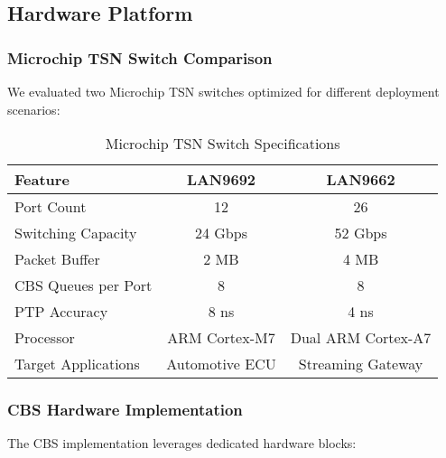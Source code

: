 \documentclass[10pt, journal, compsoc]{IEEEtran}
\begin{document}
\subsection{Hardware Platform}

\subsubsection{Microchip TSN Switch Comparison}

We evaluated two Microchip TSN switches optimized for different deployment scenarios:

\begin{table}[h]
\centering
\caption{Microchip TSN Switch Specifications}
\label{tab:microchip_specs}
\begin{tabular}{lcc}
\toprule
\textbf{Feature} & \textbf{LAN9692} & \textbf{LAN9662} \\
\midrule
Port Count & 12 & 26 \\
Switching Capacity & 24 Gbps & 52 Gbps \\
Packet Buffer & 2 MB & 4 MB \\
CBS Queues per Port & 8 & 8 \\
PTP Accuracy & 8 ns & 4 ns \\
Processor & ARM Cortex-M7 & Dual ARM Cortex-A7 \\
Target Applications & Automotive ECU & Streaming Gateway \\
\bottomrule
\end{tabular}
\end{table}

\subsubsection{CBS Hardware Implementation}

The CBS implementation leverages dedicated hardware blocks:
\end{document}
